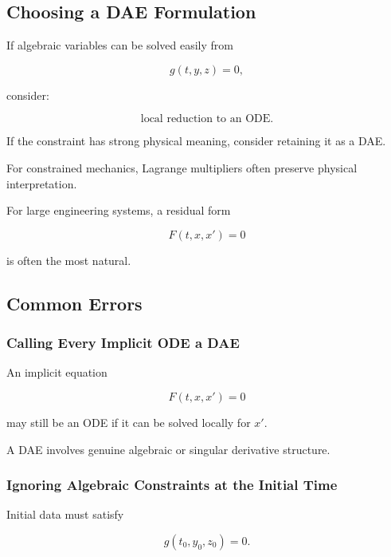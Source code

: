 \subsection{Choosing a DAE Formulation}
\label{subsec:choosing-dae-formulation}

If algebraic variables can be solved easily from

\[
g(t,y,z)=0,
\]

consider:

\[
\boxed{
\text{local reduction to an ODE}.
}
\]

If the constraint has strong physical meaning, consider retaining it as a
DAE.

For constrained mechanics, Lagrange multipliers often preserve physical
interpretation.

For large engineering systems, a residual form

\[
\boxed{
F(t,x,x')=0
}
\]

is often the most natural.

\subsection{Common Errors}
\label{subsec:dae-common-errors}

\subsubsection{Calling Every Implicit ODE a DAE}

An implicit equation

\[
F(t,x,x')=0
\]

may still be an ODE if it can be solved locally for \(x'\).

A DAE involves genuine algebraic or singular derivative structure.

\subsubsection{Ignoring Algebraic Constraints at the Initial Time}

Initial data must satisfy

\[
\boxed{
g(t_0,y_0,z_0)=0.
}
\]

